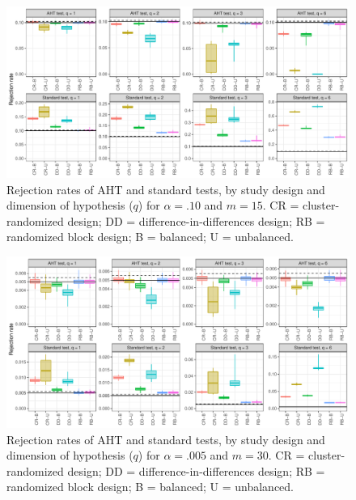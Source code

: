\documentclass[12pt]{article}
\begin{document}
\begin{landscape}
\begin{figure}[p]
{\centering \includegraphics[width=\linewidth]{CR_fig/balance_10_15-1} 

}

\caption{Rejection rates of AHT and standard tests, by study design and dimension of hypothesis ($q$) for $\alpha = .10$ and $m = 15$. CR = cluster-randomized design; DD = difference-in-differences design; RB = randomized block design; B = balanced; U = unbalanced.}\label{fig:balance_10_15}
\end{figure}

\begin{figure}[p]

{\centering \includegraphics[width=\linewidth]{CR_fig/balance_005_30-1} 

}

\caption{Rejection rates of AHT and standard tests, by study design and dimension of hypothesis ($q$) for $\alpha = .005$ and $m = 30$. CR = cluster-randomized design; DD = difference-in-differences design; RB = randomized block design; B = balanced; U = unbalanced.}\label{fig:balance_005_30}
\end{figure}

\begin{figure}[p]


\end{figure}
\end{landscape}
\end{document}
